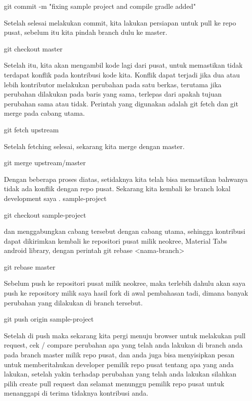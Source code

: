 \noindent 
git commit -m "fixing sample project and compile gradle added" \par
\noindent 
Setelah selesai melakukan commit, kita lakukan persiapan untuk pull ke repo pusat, sebelum itu kita pindah branch dulu ke master. \par
\noindent 
git checkout master \par
\noindent 
Setelah itu, kita akan mengambil kode lagi dari pusat, untuk memastikan tidak terdapat konflik pada kontribusi kode kita. Konflik dapat terjadi jika dua atau lebih kontributor melakukan perubahan pada satu berkas, terutama jika perubahan dilakukan pada baris yang sama, terlepas dari apakah tujuan perubahan sama atau tidak. Perintah yang digunakan adalah git fetch dan git merge pada cabang utama. \par
\noindent 
git fetch upstream \par
\noindent 
Setelah fetching selesai, sekarang kita merge dengan master. \par
\noindent 
git merge upstream/master \par
\noindent 
Dengan beberapa proses diatas, setidaknya kita telah bisa memastikan bahwanya tidak ada konflik dengan repo pusat. Sekarang kita kembali ke branch lokal development saya . sample-project \par
\noindent 
git checkout sample-project \par
\noindent 
dan menggabungkan cabang tersebut dengan cabang utama, sehingga kontribusi dapat dikirimkan kembali ke repositori pusat milik neokree, Material Tabs android library, dengan perintah git rebase <nama-branch> \par
\noindent 
git rebase master \par
\noindent 
Sebelum push ke repositori pusat milik neokree, maka terlebih dahulu akan saya push ke repository milik saya hasil fork di awal pembahasan tadi, dimana banyak perubahan yang dilakukan di branch tersebut. \par
\noindent 
git push origin sample-project \par
\noindent 
Setelah di push maka sekarang kita pergi menuju browser untuk melakukan pull request, cek / compare perubahan apa yang telah anda lakukan di branch anda pada branch master milik repo pusat, dan anda juga bisa menyisipkan pesan untuk memberitahukan developer pemilik repo pusat tentang apa yang anda lakukan, setelah yakin terhadap perubahan yang telah anda lakukan silahkan pilih create pull request dan selamat menunggu pemilik repo pusat untuk menanggapi di terima tidaknya kontribusi anda. \par
